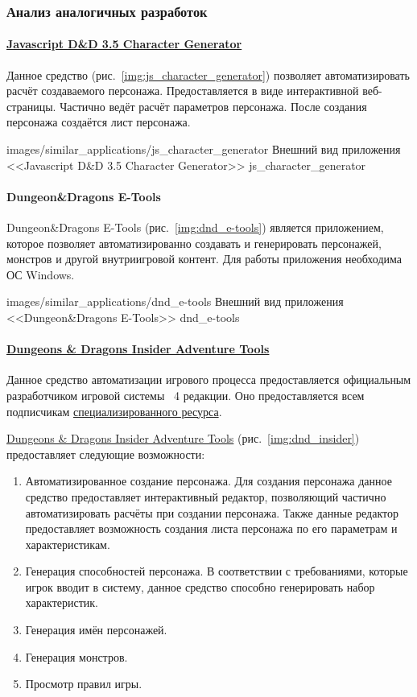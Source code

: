 \subsubsection{Анализ аналогичных разработок}


\paragraph{\href{http://www.pathguy.com/cg35.htm}{Javascript D\&D 3.5 Character Generator}}
Данное средство (рис.~\ref{img:js_character_generator}) позволяет автоматизировать расчёт создаваемого персонажа. Предоставляется в виде интерактивной веб-страницы. Частично ведёт расчёт параметров персонажа. После создания персонажа создаётся лист персонажа.

            {images/similar_applications/js_character_generator}
            {Внешний вид приложения <<Javascript D\&D 3.5 Character Generator>>}
            {js_character_generator}


\paragraph{Dungeon\&Dragons E-Tools}
Dungeon\&Dragons E-Tools (рис.~\ref{img:dnd_e-tools}) является приложением, которое позволяет автоматизированно создавать и генерировать персонажей, монстров и другой внутриигровой контент. Для работы приложения необходима ОС Windows.

            {images/similar_applications/dnd_e-tools}
            {Внешний вид приложения <<Dungeon\&Dragons E-Tools>>}
            {dnd_e-tools}


\paragraph{\href{http://www.wizards.com/dnd/Tool.aspx?x=dnd/4new/tool/adventuretools}{Dungeons \& Dragons Insider Adventure Tools}}
Данное средство автоматизации игрового процесса предоставляется официальным разработчиком игровой системы \dnd\ 4 редакции. Оно предоставляется всем подписчикам \href{http://www.wizards.com/dnd}{специализированного ресурса}.

\href{http://www.wizards.com/dnd/Tool.aspx?x=dnd/4new/tool/adventuretools}{Dungeons \& Dragons Insider Adventure Tools} (рис.~\ref{img:dnd_insider}) предоставляет следующие возможности:
\begin{enumerate}
\item Автоматизированное создание персонажа. Для создания персонажа данное средство предоставляет интерактивный редактор, позволяющий частично автоматизировать расчёты при создании персонажа. Также данные редактор предоставляет возможность создания листа персонажа по его параметрам и характеристикам.
\item Генерация способностей персонажа. В соответствии с требованиями, которые игрок вводит в систему, данное средство способно генерировать набор характеристик.
\item Генерация имён персонажей.
\item Генерация монстров.
\item Просмотр правил игры.
\end{enumerate}

